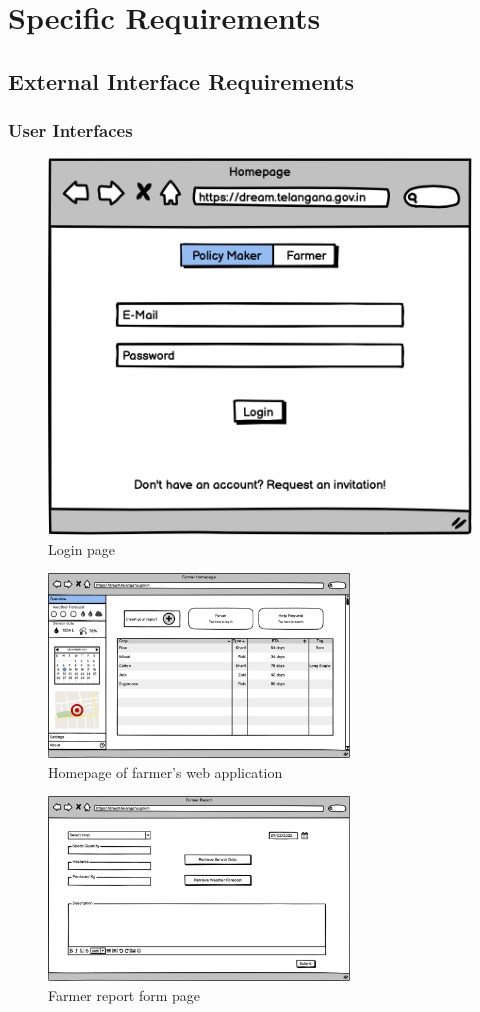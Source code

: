 \documentclass[10pt]{article}
\begin{document}
\section{Specific Requirements}
\subsection{External Interface Requirements}
\subsubsection{User Interfaces}
\begin{figure}[ht!]
    \centering
    \includegraphics[scale=0.45]{ui/login.png}
    \caption{Login page}
\end{figure}
\begin{figure}[ht!]
    \centering
    \includegraphics[width=8cm]{farmer_homepage.png} 
    \caption{Homepage of farmer's web application} 
\end{figure}
\begin{figure}[ht!]
    \centering
    \includegraphics[width=8cm]{report.png}  
    \caption{Farmer report form page}
\end{figure}
\end{document}
